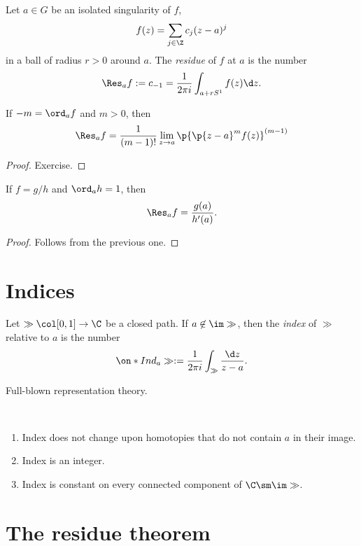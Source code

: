 \begin{definition}
  Let $a \in G$ be an isolated singularity of $f$,
  $$ f(z) = \sum_{j \in \Z} c_j (z-a)^j $$
  in a ball of radius $r > 0$ around $a$.
  The \emph{residue} of $f$ at $a$ is the number
  $$ \Res_a f := c_{-1} = \frac{1}{2\pi i} \int_{a+rS^1} f(z) \d z. $$
\end{definition}

\begin{lemma}
  If $-m = \ord_a f$ and $m > 0$, then
  $$ \Res_a f = \frac{1}{(m-1)!} \lim_{z \to a} \p{ \p{z-a}^m f(z) }^{(m-1)} $$
\end{lemma}

\begin{proof}
  Exercise.
\end{proof}

\begin{lemma}
  If $f = g/h$ and $\ord_a h = 1$, then
  $$ \Res_a f = \frac{g(a)}{h'(a)}. $$
\end{lemma}

\begin{proof}
  Follows from the previous one.
\end{proof}

\section{Indices}

\newcommand{\Ind}[0]{\on*{Ind}}

\begin{definition}
  Let $\gg \col [0, 1] \to \C$ be a closed path.
  If $a \not\in \im \gg$, then the \emph{index} of $\gg$ relative to $a$ is the number
  $$ \Ind_a \gg := \frac{1}{2\pi i} \int_\gg \frac{\d z}{z - a}. $$
\end{definition}

Full-blown representation theory.

\begin{lemma}
  ~\begin{enumerate}
    \item Index does not change upon homotopies that do not contain $a$ in their image.
    \item Index is an integer.
    \item Index is constant on every connected component of $\C \sm \im \gg$.
  \end{enumerate}
\end{lemma}

\section{The residue theorem}


